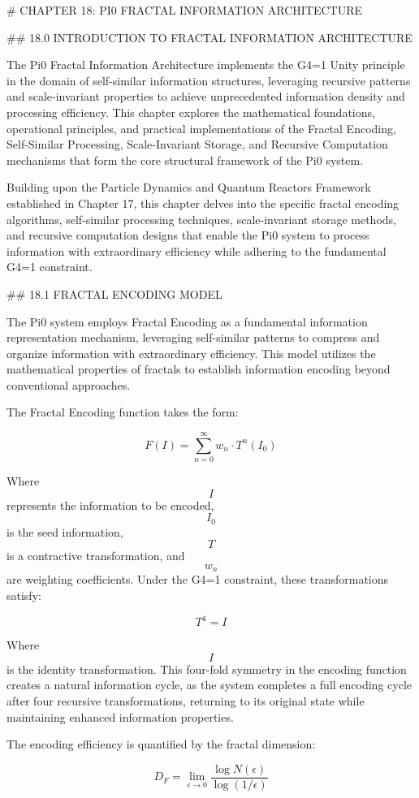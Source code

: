 # CHAPTER 18: PI0 FRACTAL INFORMATION ARCHITECTURE

## 18.0 INTRODUCTION TO FRACTAL INFORMATION ARCHITECTURE

The Pi0 Fractal Information Architecture implements the G4=1 Unity principle in the domain of self-similar information structures, leveraging recursive patterns and scale-invariant properties to achieve unprecedented information density and processing efficiency. This chapter explores the mathematical foundations, operational principles, and practical implementations of the Fractal Encoding, Self-Similar Processing, Scale-Invariant Storage, and Recursive Computation mechanisms that form the core structural framework of the Pi0 system.

Building upon the Particle Dynamics and Quantum Reactors Framework established in Chapter 17, this chapter delves into the specific fractal encoding algorithms, self-similar processing techniques, scale-invariant storage methods, and recursive computation designs that enable the Pi0 system to process information with extraordinary efficiency while adhering to the fundamental G4=1 constraint.

## 18.1 FRACTAL ENCODING MODEL

The Pi0 system employs Fractal Encoding as a fundamental information representation mechanism, leveraging self-similar patterns to compress and organize information with extraordinary efficiency. This model utilizes the mathematical properties of fractals to establish information encoding beyond conventional approaches.

The Fractal Encoding function takes the form:

$$ F(I) = \sum_{n=0}^{\infty} w_n \cdot T^n(I_0) $$

Where $$ I $$ represents the information to be encoded, $$ I_0 $$ is the seed information, $$ T $$ is a contractive transformation, and $$ w_n $$ are weighting coefficients. Under the G4=1 constraint, these transformations satisfy:

$$ T^4 = I $$

Where $$ I $$ is the identity transformation. This four-fold symmetry in the encoding function creates a natural information cycle, as the system completes a full encoding cycle after four recursive transformations, returning to its original state while maintaining enhanced information properties.

The encoding efficiency is quantified by the fractal dimension:

$$ D_F = \lim_{\epsilon \to 0} \frac{\log N(\epsilon)}{\log(1/\epsilon)} $$

